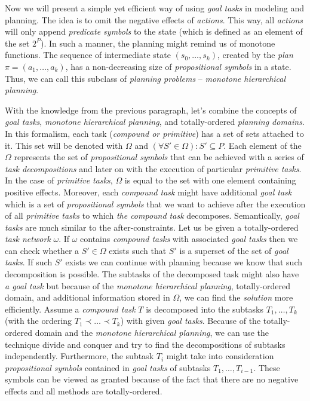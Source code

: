\medskip\noindent
Now we will present a simple yet efficient way of using \emph{goal tasks} in modeling and planning. The idea is to omit the negative effects of \emph{actions}. This way, all \emph{actions} will only append \emph{predicate symbols} to the state (which is defined as an element of the set $2^P$). In such a manner, the planning might remind us of monotone functions. The sequence of intermediate state $(s_0, \dots, s_k)$, created by the \emph{plan} $\pi = (a_1, \dots, a_k)$, has a non-decreasing size of \emph{propositional symbols} in a state. Thus, we can call this subclass of \emph{planning problems} – \emph{monotone hierarchical planning}.

\medskip\noindent
With the knowledge from the previous paragraph, let's combine the concepts of \emph{goal tasks}, \emph{monotone hierarchical planning}, and totally-ordered \emph{planning domains}. In this formalism, each task (\emph{compound or primitive}) has a set of sets attached to it. This set will be denoted with $\Omega$ and $(\forall S' \in \Omega): S' \subseteq P$. Each element of the $\Omega$ represents the set of \emph{propositional symbols} that can be achieved with a series of \emph{task decompositions} and later on with the execution of particular \emph{primitive tasks}. In the case of \emph{primitive tasks}, $\Omega$ is equal to the set with one element containing positive effects. Moreover, each \emph{compound task} might have additional \emph{goal task} which is a set of \emph{propositional symbols} that we want to achieve after the execution of all \emph{primitive tasks} to which \emph{the compound task} decomposes. Semantically, \emph{goal tasks} are much similar to the after-constraints. Let us be given a totally-ordered \emph{task network} $\omega$. If $\omega$ contains \emph{compound tasks} with associated \emph{goal tasks} then we can check whether a $S' \in \Omega$ exists such that $S'$ is a superset of the set of \emph{goal tasks}. If such $S'$ exists we can continue with planning because we know that such decomposition is possible. The subtasks of the decomposed task might also have \emph{a goal task} but because of the \emph{monotone hierarchical planning}, totally-ordered domain, and additional information stored in $\Omega$, we can find the \emph{solution} more efficiently. Assume a \emph{compound task} $T$ is decomposed into the subtasks $T_1, \dots, T_k$ (with the ordering  $T_1 \prec \dots \prec T_k$) with given \emph{goal tasks}. Because of the totally-ordered domain and the \emph{monotone hierarchical planning}, we can use the technique divide and conquer and try to find the decompositions of subtasks independently. Furthermore, the subtask $T_i$ might take into consideration \emph{propositional symbols} contained in \emph{goal tasks} of subtasks $T_1, \dots, T_{i - 1}$. These symbols can be viewed as granted because of the fact that there are no negative effects and all methods are totally-ordered.